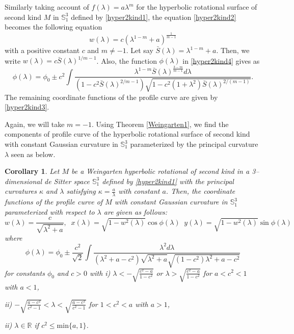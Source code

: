 \documentclass{amsart}
\newtheorem{Corollary}[Theorem]{Corollary}
\theoremstyle{definition}
\numberwithin{equation}{section}
\begin{document}
Similarly taking account of $f(\lambda)=a\lambda^m$ for the hyperbolic rotational surface of second kind $M$ in $\mathbb{S}^3_1$ defined by \eqref{hyper2kind1}, 
the equation \eqref{hyper2kind2} becomes the following equation
\begin{equation}
    w(\lambda)=c(\lambda^{1-m}+a)^{\frac{1}{m-1}}
\end{equation}
with a positive constant $c$ and $m\neq -1$. 
Let say $\bar{S}(\lambda)=\lambda^{1-m}+a$. 
Then, we write $w(\lambda)=c\bar{S}(\lambda)^{1/{m-1}}$. 
Also, the function $\phi(\lambda)$ in \eqref{hyper2kind4} gives as
\begin{equation}
    \label{hyper2kind6}
    \phi(\lambda)=\phi_0\pm c^2
    \int{\frac{\lambda^{1-m} \bar{S}(\lambda)^{\frac{3-m}{m-1}} d\lambda}
    {(1-c^2\bar{S}(\lambda)^{2/{m-1}})
    \sqrt{1-c^2(1+\lambda^2)\bar{S}(\lambda)^{2/{(m-1)}}}}}.
\end{equation}
The remaining coordinate functions of the profile curve
are given by \eqref{hyper2kind3}.

Again, we will take $m=-1$. 
Using Theorem \ref{Weingarten1}, we find the components of profile curve of 
the hyperbolic rotational surface of second kind with constant Gaussian curvature in $\mathbb{S}^3_1$ parameterized by the principal curvature $\lambda$ seen as below. 

\begin{Corollary}
Let $M$ be a Weingarten hyperbolic rotational of second kind in a 3--dimensional de Sitter space $\mathbb{S}^3_1$ defined by \eqref{hyper2kind1} with the principal curvatures $\kappa$ and $\lambda$ satisfying $\kappa=\frac{a}{\lambda}$
with constant $a$. Then, the coordinate functions of the profile curve
of $M$ with constant Gaussian curvature in $\mathbb{S}^3_1$ parameterized with respect to $\lambda$ are given as follows:
    \begin{equation}
        w(\lambda)=\frac{c}{\sqrt{\lambda^2+a}},\;\; 
        x(\lambda)=\sqrt{1-w^2(\lambda)}\cos{\phi(\lambda)}\;\;
        y(\lambda)=\sqrt{1-w^2(\lambda)}\sin{\phi(\lambda)}
    \end{equation}
where 
\begin{equation}
    \phi(\lambda)=\phi_0\pm\frac{c^2}{\sqrt{2}}
    \int{
    \frac{\lambda^2 d\lambda}
    {(\lambda^2+a-c^2)\sqrt{\lambda^2+a}\sqrt{(1-c^2)\lambda^2+a-c^2}}}
\end{equation}
for constants $\phi_0$ and $c>0$ with 
\subitem i) 
$\displaystyle{\lambda<-\sqrt{\frac{c^2-a}{1-c^2}}}$ or 
$\displaystyle{\lambda>\sqrt{\frac{c^2-a}{1-c^2}}}$ for $a<c^2<1$ with $a<1$,

\subitem ii) $-\sqrt{\frac{a-c^2}{c^2-1}}<\lambda
<\sqrt{\frac{a-c^2}{c^2-1}}$ for $1<c^2<a$ with $a>1$,

\subitem ii) $\lambda\in\mathbb{R}$ if $c^2\leq\mbox{min}\{a,1\}$.
\end{Corollary}
\end{document}
